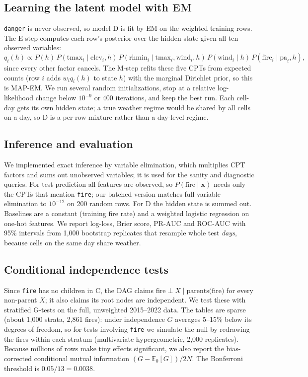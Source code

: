 \documentclass[11pt]{article}
\begin{document}
\subsection{Learning the latent model with EM}
\texttt{danger} is never observed, so model D is fit by EM on the weighted training rows. The
E-step computes each row's posterior over the hidden state given all ten observed variables:
\[
q_i(h) \propto P(h)\,P(\text{tmax}_i \mid \text{elev}_i, h)\,P(\text{rhmin}_i \mid \text{tmax}_i, \text{wind}_i, h)\,
P(\text{wind}_i \mid h)\,P(\text{fire}_i \mid \text{pa}_i, h),
\]
since every other factor cancels. The M-step refits these five CPTs from expected counts (row $i$
adds $w_i q_i(h)$ to state $h$) with the marginal Dirichlet prior, so this is MAP-EM. We run several
random initializations, stop at a relative log-likelihood change below $10^{-9}$ or 400 iterations,
and keep the best run. Each cell-day gets its own hidden state; a true weather regime would be shared
by all cells on a day, so D is a per-row mixture rather than a day-level regime.

\subsection{Inference and evaluation}
We implemented exact inference by variable elimination, which multiplies CPT factors and sums out
unobserved variables; it is used for the sanity and diagnostic queries. For test prediction all
features are observed, so $P(\text{fire}\mid\mathbf{x})$ needs only the CPTs that mention
\texttt{fire}; our batched version matches full variable elimination to $10^{-12}$ on 200 random rows.
For D the hidden state is summed out. Baselines are a constant (training fire rate) and a weighted
logistic regression on one-hot features. We report log-loss, Brier score, PR-AUC and ROC-AUC with
95\% intervals from 1,000 bootstrap replicates that resample whole test \emph{days}, because cells on
the same day share weather.

\subsection{Conditional independence tests}
\label{sec:ci}
Since \texttt{fire} has no children in C, the DAG claims $\text{fire}\perp X \mid
\text{parents(fire)}$ for every non-parent $X$; it also claims its root nodes are independent. We
test these with stratified G-tests on the full, unweighted 2015--2022 data. The tables are sparse
(about 1,000 strata, 2,861 fires): under independence $G$ averages 5--15\% below its degrees of
freedom, so for tests involving \texttt{fire} we simulate the null by redrawing the fires within each
stratum (multivariate hypergeometric, 2,000 replicates). Because millions of rows make tiny effects
significant, we also report the bias-corrected conditional mutual information $(G-\mathbb{E}_0[G])/2N$.
The Bonferroni threshold is $0.05/13=0.0038$.
\end{document}
